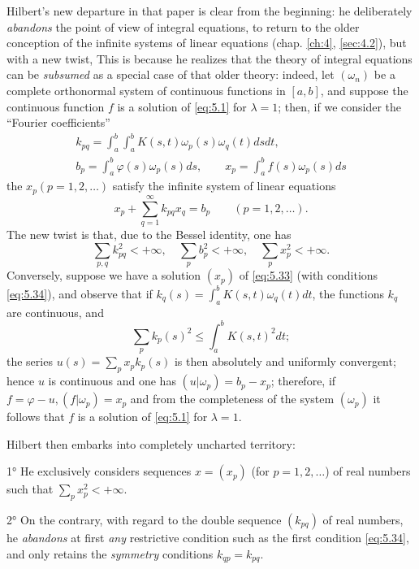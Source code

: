 \documentclass[12pt,a4paper,leqno,twoside]{extbook}
\begin{document}
Hilbert's new departure in that paper is clear from the beginning: he deliberately \emph{abandons} the point of view of integral equations, to return to the older conception of the infinite systems of linear equations (chap. \ref{ch:4}, \ref{sec:4.2}), but with a new twist, This is because he realizes that the theory of integral equations can be \emph{subsumed} as a special case of that older theory: indeed, let \((\omega_n)\) be a complete orthonormal system of continuous functions in \([a,b]\), and suppose the continuous function \(f\) is a solution of \eqref{eq:5.1} for \(\lambda = 1\); then, if we consider the ``Fourier coefficients''
\begin{equation}
    \label{eq:5.32}
    \begin{gathered}
        k_{pq} = \int_a^b \int_a^b K(s,t)\omega_p(s)\omega_q(t)dsdt, \\
        b_p = \int_a^b \varphi(s)\omega_p(s)ds, \qquad x_p = \int_a^b f(s)\omega_p(s)ds
    \end{gathered}
\end{equation}
the \(x_p (p=1,2, \ldots)\) satisfy the infinite system of linear equations
\begin{equation}
    \label{eq:5.33}
    x_p + \sum_{q=1}^\infty k_{pq}x_q = b_p \qquad (p=1,2,\ldots).
\end{equation}
The new twist is that, due to the Bessel identity, one has
\begin{equation}
    \label{eq:5.34}
    \sum_{p,q} k_{pq}^2 < +\infty, \quad
    \sum_p b_p^2 < +\infty, \quad
    \sum_p x_p^2 < +\infty.
\end{equation}
Conversely, suppose we have a solution \((x_p)\) of \eqref{eq:5.33} (with conditions \eqref{eq:5.34}), and observe that if \(k_q(s) = \int_a^b K(s,t)\omega_q(t)dt\), the functions \(k_q\) are continuous, and
\[
    \sum_p k_p(s)^2 \leq \int_a^b K(s,t)^2 dt;
\]
the series \(u(s) = \sum\limits_p x_p k_p(s)\) is then absolutely and uniformly convergent; hence \(u\) is continuous and one has \((u|\omega_p)=b_p - x_p\); therefore, if \(f = \varphi - u, (f|\omega_p) = x_p\) and from the completeness of the system \((\omega_p)\) it follows that \(f\) is a solution of \eqref{eq:5.1} for \(\lambda = 1\).

Hilbert then embarks into completely uncharted territory:

1° He exclusively considers sequences \(x = (x_p)\) (for \(p=1,2,\ldots\)) of real numbers such that \(\sum\limits_p x_p^2 < +\infty\).

2° On the contrary, with regard to the double sequence \((k_{pq})\) of real numbers, he \emph{abandons} at first \emph{any} restrictive condition such as the first condition \eqref{eq:5.34}, and only retains the \emph{symmetry} conditions \(k_{qp} = k_{pq}\).
\end{document}
